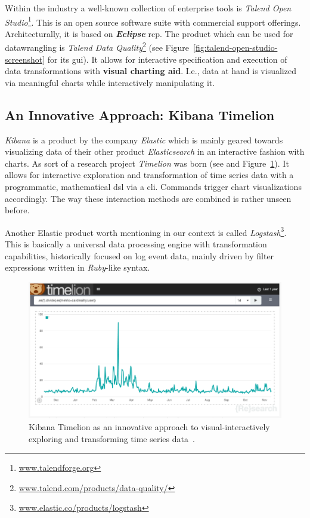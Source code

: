 Within the industry a well-known collection of enterprise tools is \emph{Talend Open Studio}\footnote{\textcolor{blue}{\href{https://www.talendforge.org/}{www.talendforge.org}}}.
This is an open source software suite with commercial support offerings.
Architecturally, it is based on \emph{\textbf{Eclipse}} \gls{rcp}.
The product which can be used for \gls{datawrangling} is \emph{Talend Data Quality}\footnote{\textcolor{blue}{\href{https://www.talend.com/products/data-quality/}{www.talend.com/products/data-quality/}}} (see Figure~\ref{fig:talend-open-studio-screenshot} for its \gls{gui}).
It allows for interactive specification and execution of data transformations with \textbf{visual charting aid}.
I.e., data at hand is visualized via meaningful charts while interactively manipulating it.


\subsection{An Innovative Approach: Kibana Timelion}

\emph{Kibana} is a product by the company \emph{Elastic} which is mainly geared towards visualizing data of their other product \emph{Elasticsearch} in an interactive fashion with charts.
As sort of a research project \emph{Timelion} was born (see \cite{web:Timelion} and Figure~\ref{fig:kibana-timelion}).
It allows for interactive exploration and transformation of time series data with a programmatic, mathematical \gls{dsl} via a \gls{cli}.
Commands trigger chart visualizations accordingly.
The way these interaction methods are combined is rather unseen before.

Another Elastic product worth mentioning in our context is called \emph{Logstash}\footnote{\textcolor{blue}{\href{https://www.elastic.co/products/logstash}{www.elastic.co/products/logstash}}}.
This is basically a universal data processing engine with transformation capabilities, historically focused on log event data, mainly driven by filter expressions written in \emph{Ruby}-like syntax.

\begin{figure}[h]
  \centering
  \includegraphics[width=1.0\textwidth]{figures/state-of-the-art/kibana-timelion}
  \caption{Kibana Timelion as an innovative approach to visual-interactively exploring and transforming time series data~\cite{web:Timelion}.}
  \label{fig:kibana-timelion}
\end{figure}



